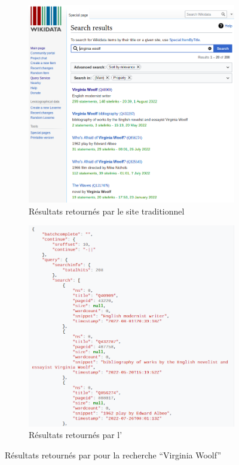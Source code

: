 \begin{figure}[h!]
	\centering
	\begin{subfigure}{0.48\textwidth}
		\includegraphics[width=\textwidth]{img/wd_base.png}
		\caption{Résultats retournés par le site traditionnel}
		\label{fig:wd_base}
	\end{subfigure}
	\begin{subfigure}{0.48\textwidth}
		\includegraphics[width=\textwidth]{img/wd_api.png}
		\caption{Résultats retournés par l'\api{}}
		\label{fig:wd_api}
	\end{subfigure}
	\caption{Résultats retournés par \wkd{} pour la recherche \enquote{Virginia Woolf}}
	\label{fig:wd_search}
\end{figure}

